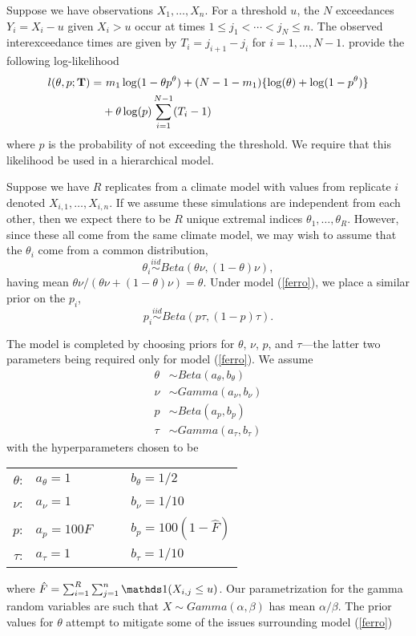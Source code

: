 Suppose we have observations $X_1,\ldots,X_n$. For a threshold $u$, the $N$ exceedances $Y_i=X_i-u$ given $X_i>u$ occur at times $1\leq j_1<\cdots< j_N\leq n$. The observed interexceedance times are given by $T_i=j_{i+1}-j_i$ for $i=1,\ldots,N-1$. \cite{ferro2003inference} provide the following log-likelihood
\begin{align}
l(\theta, p; \mathbf{\bm{T}}) =&~ m_1\log(1-\theta p^\theta) + (N-1-m_1)\{\log(\theta)+ \log(1-p^\theta)\} \nonumber \\
 &+ \theta\log(p)\sum_{i=1}^{N-1}(T_i-1) \label{ferro}
\end{align}
where $p$ is the probability of not exceeding the threshold. We require that this likelihood be used in a hierarchical model.

Suppose we have $R$ replicates from a climate model with values from replicate $i$ denoted $X_{i,1},\ldots,X_{i,n}$. If we assume these simulations are independent from each other, then we expect there to be $R$ unique extremal indices $\theta_1,\ldots,\theta_R$. However, since these all come from the same climate model, we may wish to assume that the $\theta_i$ come from a common distribution,
\[ \theta_i \overset{iid}\sim Beta\left(\theta\nu, (1-\theta)\nu\right), \]
having mean $\theta\nu /(\theta\nu + (1-\theta)\nu) = \theta$. Under model (\ref{ferro}), we place a similar prior on the $p_i$,
\[ p_i \overset{iid}\sim Beta\left(p\tau, (1-p)\tau\right). \]

The model is completed by choosing priors for $\theta$, $\nu$, $p$, and $\tau$---the latter two parameters being required only for model (\ref{ferro}). We assume
\begin{align*}
\theta &\sim Beta(a_\theta, b_\theta) \\
\nu &\sim Gamma(a_\nu, b_\nu) \\
p &\sim Beta(a_p, b_p) \\
\tau &\sim Gamma(a_\tau, b_\tau) 
\end{align*}
with the hyperparameters chosen to be
\begin{center}
\begin{tabular}{rlcl}
$\theta$: & $a_\theta = 1          $ &~~& $b_\theta = 1/2             $ \\
$   \nu$: & $   a_\nu = 1          $ &~~& $   b_\nu = 1/10            $ \\
$     p$: & $     a_p = 100 \hat{F}$ &~~& $     b_p = 100 (1-\hat{F}) $ \\
$  \tau$: & $  a_\tau = 1          $ &~~& $  b_\tau = 1/10            $ \\
\end{tabular}
\end{center}
where $\hat{F}=\sum_{i=1}^R\sum_{j=1}^n \ind(X_{i,j}\leq u)$. Our parametrization for the gamma random variables are such that $X\sim Gamma(\alpha,\beta)$ has mean $\alpha/\beta$. The prior values for $\theta$ attempt to mitigate some of the issues surrounding model (\ref{ferro})

